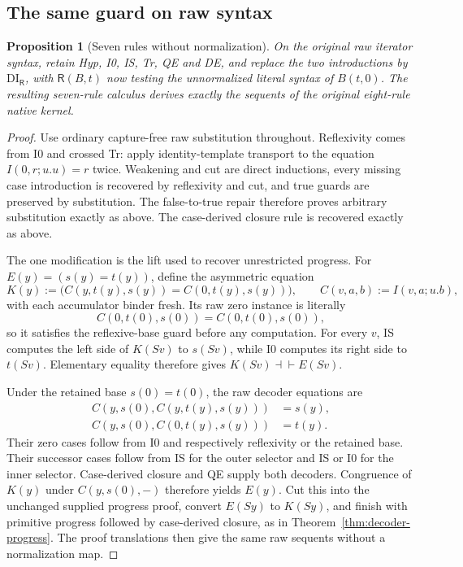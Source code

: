 \documentclass[11pt,a4paper]{article}
\newtheorem{proposition}[theorem]{Proposition}
\theoremstyle{definition}
\begin{document}
\subsection{The same guard on raw syntax}

\begin{proposition}[Seven rules without normalization]
On the original raw iterator syntax, retain Hyp, I0, IS, Tr, QE and DE,
and replace the two introductions by $\mathrm{DI}_{\mathsf R}$, with
$\mathsf R(B,t)$ now testing the unnormalized literal syntax of
$B(t,0)$.  The resulting seven-rule calculus derives exactly the
sequents of the original eight-rule native kernel.
\end{proposition}
\begin{proof}
Use ordinary capture-free raw substitution throughout.  Reflexivity
comes from I0 and crossed Tr: apply identity-template transport to the
equation $I(0,r;u.u)=r$ twice.  Weakening and cut are direct inductions,
every missing case introduction is recovered by reflexivity and cut,
and true guards are preserved by substitution.  The false-to-true repair
therefore proves arbitrary substitution exactly as above.  The case-derived closure rule is recovered exactly as above.

The one modification is the lift used to recover unrestricted progress.
For $E(y)=(s(y)=t(y))$, define the asymmetric equation
\[
 K(y):=
 \bigl(C(y,t(y),s(y))=C(0,t(y),s(y))\bigr),
 \qquad C(v,a,b):=I(v,a;u.b),
\]
with each accumulator binder fresh.  Its raw zero instance is literally
\[
 C(0,t(0),s(0))=C(0,t(0),s(0)),
\]
so it satisfies the reflexive-base guard before any computation.
For every $v$, IS computes the left side of $K(Sv)$ to $s(Sv)$,
while I0 computes its right side to $t(Sv)$.  Elementary equality
therefore gives $K(Sv)\dashv\vdash E(Sv)$.

Under the retained base $s(0)=t(0)$, the raw decoder equations are
\begin{align*}
 C(y,s(0),C(y,t(y),s(y)))&=s(y),\\
 C(y,s(0),C(0,t(y),s(y)))&=t(y).
\end{align*}
Their zero cases follow from I0 and respectively reflexivity or the retained
base.  Their successor cases follow from IS for the outer selector and
IS or I0 for the inner selector.  Case-derived closure and QE supply both
decoders.  Congruence of $K(y)$ under $C(y,s(0),-)$ therefore yields $E(y)$.
Cut this into the unchanged supplied progress proof, convert $E(Sy)$
to $K(Sy)$, and finish with primitive progress followed by case-derived
closure, as in Theorem~\ref{thm:decoder-progress}.  The proof translations
then give the same raw sequents without a normalization map.
\end{proof}
\end{document}
